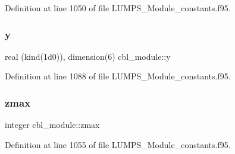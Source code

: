Definition at line 1050 of file L\+U\+M\+P\+S\+\_\+\+Module\+\_\+constants.\+f95.

\mbox{\label{namespacecbl__module_a3d7f7d5671cd679f69c81da2fbf797e2}} 
\subsubsection{\texorpdfstring{y}{y}}
{\footnotesize\ttfamily real (kind(1d0)), dimension(6) cbl\+\_\+module\+::y}



Definition at line 1088 of file L\+U\+M\+P\+S\+\_\+\+Module\+\_\+constants.\+f95.

\mbox{\label{namespacecbl__module_ad6ee0356644a1bc5acc13c4dc71ad4f9}} 
\subsubsection{\texorpdfstring{zmax}{zmax}}
{\footnotesize\ttfamily integer cbl\+\_\+module\+::zmax}



Definition at line 1055 of file L\+U\+M\+P\+S\+\_\+\+Module\+\_\+constants.\+f95.

